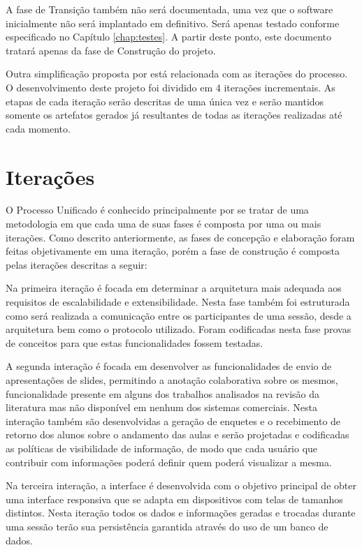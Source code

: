 A fase de Transição também não será documentada, uma vez que o software inicialmente não será implantado em definitivo. Será apenas testado conforme especificado no Capítulo \ref{chap:testes}. A partir deste ponto, este documento tratará apenas da fase de Construção do projeto.

Outra simplificação proposta por  está relacionada com as iterações do processo. O desenvolvimento deste projeto foi dividido em 4 iterações incrementais. As etapas de cada iteração serão descritas de uma única vez e serão mantidos somente os artefatos gerados já resultantes de todas as iterações realizadas até cada momento.


\section{Iterações}

O Processo Unificado é conhecido principalmente por se tratar de uma metodologia em que cada uma de suas fases é composta por uma ou mais iterações. Como descrito anteriormente, as fases de concepção e elaboração foram feitas objetivamente em uma iteração, porém a fase de construção é composta pelas iterações descritas a seguir:

Na primeira iteração é focada em determinar a arquitetura mais adequada aos requisitos de escalabilidade e extensibilidade. Nesta fase também foi estruturada como será realizada a comunicação entre os participantes de uma sessão, desde a arquitetura bem como o protocolo utilizado. Foram codificadas nesta fase provas de conceitos para que estas funcionalidades fossem testadas.

A segunda interação é focada em desenvolver as funcionalidades de envio de apresentações de slides, permitindo a anotação colaborativa sobre os mesmos, funcionalidade presente em alguns dos trabalhos analisados na revisão da literatura mas não disponível em nenhum dos sistemas comerciais. Nesta interação também são desenvolvidas a geração de enquetes e o recebimento de retorno dos alunos sobre o andamento das aulas e serão projetadas e codificadas as políticas de visibilidade de informação, de modo que cada usuário que contribuir com informações poderá definir quem poderá visualizar a mesma.

Na terceira interação, a interface é desenvolvida com o objetivo principal de obter uma interface responsiva que se adapta em dispositivos com telas de tamanhos distintos. Nesta iteração todos os dados e informações geradas e trocadas durante uma sessão terão sua persistência garantida através do uso de um banco de dados.

